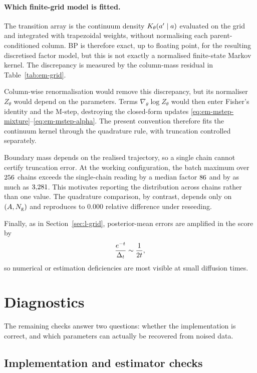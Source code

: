 \paragraph{Which finite-grid model is fitted.}
The transition array is the continuum density
$K_\theta(a'\mid a)$ evaluated on the grid and integrated with
trapezoidal weights, without normalising each parent-conditioned column.
BP is therefore exact, up to floating point, for the resulting discretised
factor model, but this is not exactly a normalised finite-state Markov kernel.
The discrepancy is measured by the column-mass residual in
Table~\ref{tab:em-grid}.

Column-wise renormalisation would remove this discrepancy, but its normaliser
$Z_\theta$ would depend on the parameters. Terms
$\nabla_\theta\log Z_\theta$ would then enter Fisher's identity and the
M-step, destroying the closed-form updates
\eqref{eq:em-mstep-mixture}--\eqref{eq:em-mstep-alpha}. The present convention
therefore fits the continuum kernel through the quadrature rule, with
truncation controlled separately.

\begin{remark}
\label{rmk:em-boundary}
Boundary mass depends on the realised trajectory, so a single chain cannot
certify truncation error. At the working configuration, the batch maximum over
$256$ chains exceeds the single-chain reading by a median factor
$86$ and by as much as $3{,}281$. This motivates reporting the
distribution across chains rather than one value. The quadrature comparison,
by contrast, depends only on $(A,N_{\mathrm{g}})$ and reproduces to $0.000$ relative
difference under reseeding.
\end{remark}

Finally, as in Section~\ref{sec:l-grid}, posterior-mean errors are amplified in
the score by
\[
  \frac{e^{-t}}{\Delta_t}\sim\frac{1}{2t},
\]
so numerical or estimation deficiencies are most visible at small diffusion
times.

\section{Diagnostics}\label{sec:em-diagnostics}

The remaining checks answer two questions: whether the implementation is
correct, and which parameters can actually be recovered from noised data.

\subsection{Implementation and estimator checks}

